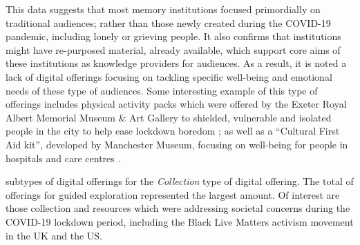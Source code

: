 \documentclass{egpubl}
\begin{document}
This data suggests that most memory institutions focused primordially on traditional audiences;  rather than those newly created during the COVID-19 pandemic, including lonely or grieving people. It also confirms that institutions might have re-purposed material, already available, which support core aims of these institutions as knowledge providers for audiences. As a result, it is noted a lack of digital offerings focusing on tackling specific well-being and emotional needs of these type of audiences. Some interesting example  of this  type of offerings includes physical activity packs which were offered by the Exeter Royal Albert Memorial Museum \& Art Gallery to shielded, vulnerable and isolated people in the city to help ease lockdown boredom \cite{ex2020}; as well as a ``Cultural First Aid kit'', developed by Manchester Museum, focusing on well-being for people in hospitals and care centres \cite{man2020}. 



 subtypes of digital offerings for the \emph{Collection} type of digital offering. The total of offerings for guided exploration represented the largest amount. Of interest are those collection and resources which were addressing  societal concerns during the COVID-19 lockdown period, including the Black Live Matters activism movement in the UK and the US. 

\end{document}

